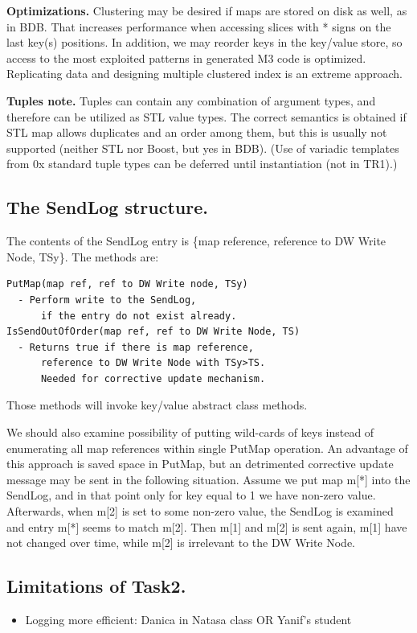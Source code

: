 \documentclass{sig-semester}
\def\M3{M3\xspace}
\begin{document}
\textbf{Optimizations. } Clustering may be desired if maps are stored on disk as well, as in BDB. That increases performance when accessing slices with * signs on the last key(s) positions. In addition, we may reorder keys in the key/value store, so access to the most exploited patterns in generated \M3 code is optimized. Replicating data and designing multiple clustered index is an extreme approach.

\textbf{Tuples note.}
Tuples can contain any combination of argument types, and therefore can be utilized as STL value types. The correct semantics is obtained if STL map allows duplicates and an order among them, but this is usually not supported (neither STL nor Boost, but yes in BDB). (Use of variadic templates from 0x standard tuple types can be deferred until instantiation (not in TR1).)

\subsection{The SendLog structure.}
The contents of the SendLog entry is \{map reference, reference to DW Write Node, TSy\}. The methods are:
\begin{verbatim}
PutMap(map ref, ref to DW Write node, TSy)
  - Perform write to the SendLog, 
      if the entry do not exist already.
IsSendOutOfOrder(map ref, ref to DW Write Node, TS)
  - Returns true if there is map reference, 
      reference to DW Write Node with TSy>TS. 
      Needed for corrective update mechanism. 
\end{verbatim}
Those methods will invoke key/value abstract class methods.

We should also examine possibility of putting wild-cards of keys instead of enumerating all map references within single PutMap operation. An advantage of this approach is saved space in PutMap, but an detrimented corrective update message may be sent in the following situation. Assume we put map m[*] into the SendLog, and in that point only for key equal to 1 we have non-zero value. Afterwards, when m[2] is set to some non-zero value, the SendLog is examined and entry m[*] seems to match m[2]. Then m[1] and m[2] is sent again, m[1] have not changed over time, while m[2] is irrelevant to the DW Write Node.

\subsection{Limitations of Task2. }
\begin{itemize}
 \item Logging more efficient: Danica in Natasa class OR Yanif's student 
\end{itemize}
\end{document}
